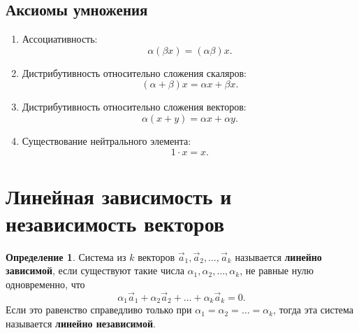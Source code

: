 \documentclass[a5paper, 11pt]{extbook}
\theoremstyle{definition}
\theoremstyle{definition}
\newtheorem{definition}{Определение}[section]
\theoremstyle{definition}
\begin{document}
\subsection{Аксиомы умножения}

\begin{enumerate}
    \item Ассоциативность:
          \[
              \alpha (\beta x) = (\alpha \beta)x.
          \]
    \item Дистрибутивность относительно сложения скаляров:
          \[
              (\alpha + \beta)x = \alpha x + \beta x.
          \]
    \item Дистрибутивность относительно сложения векторов:
          \[
              \alpha (x + y) = \alpha x + \alpha y.
          \]
    \item Существование нейтрального элемента:
          \[
              1 \cdot x  = x.
          \]
\end{enumerate}

\section{Линейная зависимость и независимость векторов}

\begin{definition}
    Система из \(k\) векторов \(\vec{a}_1, \vec{a}_2, \ldots, \vec{a}_k\) называется \textbf{линейно зависимой}, если существуют такие числа \(\alpha_1, \alpha_2, \ldots, \alpha_k\), не равные нулю одновременно, что
    \begin{equation*}
        \alpha_1 \vec{a}_1 + \alpha_2 \vec{a}_2 + \ldots + \alpha_k \vec{a}_k = 0.
    \end{equation*}
    Если это равенство справедливо только при \(\alpha_1 = \alpha_2 = \ldots = \alpha_k\), тогда эта система называется \textbf{линейно независимой}.
\end{definition}



\end{document}
